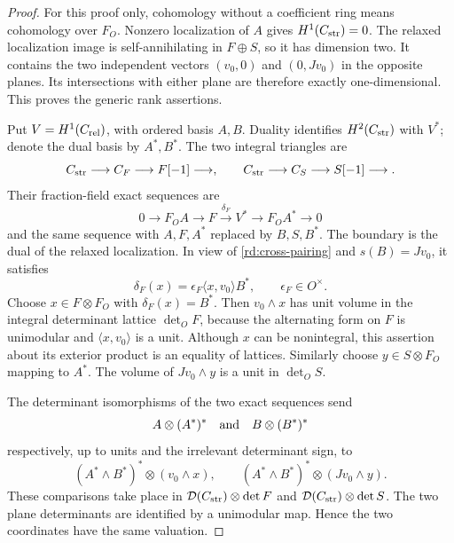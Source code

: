 \begin{proof}
For this proof only, cohomology without a coefficient ring means
cohomology over \(F_O\).  Nonzero localization of \(A\) gives
\(H^1(C_{\rm str})=0\).  The relaxed localization image is
self-annihilating in \(F\oplus S\), so it has dimension two.
It contains the two independent vectors \((v_0,0)\) and
\((0,Jv_0)\) in the opposite planes.  Its intersections with either plane are therefore
exactly one-dimensional.  This proves the generic rank assertions.

Put \(V=H^1(C_{\rm rel})\), with ordered basis \(A,B\).
Duality identifies \(H^2(C_{\rm str})\) with \(V^*\); denote the
dual basis by \(A^*,B^*\).  The two integral triangles are
\begin{equation}
 C_{\rm str}\longrightarrow C_F\longrightarrow F[-1]\longrightarrow,
 \qquad
 C_{\rm str}\longrightarrow C_S\longrightarrow S[-1]\longrightarrow.
 \label{rd:triangles}
\end{equation}
Their fraction-field exact sequences are
\[
 0\longrightarrow F_OA\longrightarrow F
       \xrightarrow{\delta_F}V^*
       \longrightarrow F_OA^*\longrightarrow0
\]
and the same sequence with \(A,F,A^*\) replaced by \(B,S,B^*\).
The boundary is the dual of the relaxed localization.  In view of
\eqref{rd:cross-pairing} and \(s(B)=Jv_0\), it satisfies
\begin{equation}
 \delta_F(x)=\epsilon_F\langle x,v_0\rangle B^*,
 \qquad \epsilon_F\in O^\times.
 \label{rd:boundary}
\end{equation}
Choose \(x\in F\otimes F_O\) with \(\delta_F(x)=B^*\).
Then \(v_0\wedge x\) has unit volume in the integral determinant
lattice \(\det_O F\), because the alternating form on \(F\) is
unimodular and \(\langle x,v_0\rangle\) is a unit.  Although \(x\)
can be nonintegral, this assertion about its exterior product is
an equality of lattices.  Similarly choose \(y\in S\otimes F_O\)
mapping to \(A^*\).  The volume of \(Jv_0\wedge y\) is a unit in
\(\det_O S\).

The determinant isomorphisms of the two exact sequences send
\[
 A\otimes(A^*)^*
 \quad\hbox{and}\quad B\otimes(B^*)^*
\]
respectively, up to units and the irrelevant determinant sign, to
\begin{equation}
 (A^*\wedge B^*)^*\otimes(v_0\wedge x),
 \qquad
 (A^*\wedge B^*)^*\otimes(Jv_0\wedge y).
 \label{rd:common-tensor}
\end{equation}
These comparisons take place in
\(\mathcal D(C_{\rm str})\otimes\det F\) and
\(\mathcal D(C_{\rm str})\otimes\det S\).
The two plane determinants are identified by a unimodular map.
Hence the two coordinates have the same valuation.


\end{proof}
